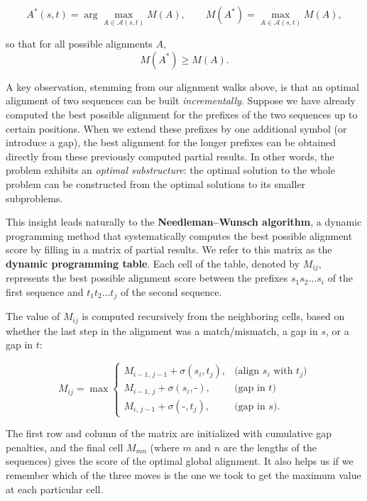 \[
A^*(s,t) = \arg\max_{A \in \mathcal{A}(s,t)} M(A),
\qquad
M(A^*) = \max_{A \in \mathcal{A}(s,t)} M(A),
\]

so that for all possible alignments $A$,
\[
M(A^*) \ge M(A).
\]


A key observation, stemming from our alignment walks above, is that an optimal alignment of two sequences can be built \emph{incrementally}. Suppose we have already computed the best possible alignment for the prefixes of the two sequences up to certain positions. When we extend these prefixes by one additional symbol (or introduce a gap), the best alignment for the longer prefixes can be obtained directly from these previously computed partial results. In other words, the problem exhibits an \emph{optimal substructure}: the optimal solution to the whole problem can be constructed from the optimal solutions to its smaller subproblems.

This insight leads naturally to the \textbf{Needleman–Wunsch algorithm}, 
a dynamic programming method that systematically computes the best possible alignment score by filling in a matrix of partial results. We refer to this matrix as the \textbf{dynamic programming table}. Each cell of the table, denoted by $M_{ij}$, represents the best possible alignment score between the prefixes $s_1 s_2 \ldots s_i$ of the first sequence and $t_1 t_2 \ldots t_j$ of the second sequence.

The value of $M_{ij}$ is computed recursively from the neighboring cells, based on whether the last step in the alignment was a match/mismatch, a gap in $s$, or a gap in $t$:

\[
M_{ij} = \max
\begin{cases}
M_{i-1,\,j-1} + \sigma(s_i, t_j), & \text{(align $s_i$ with $t_j$)}\\[6pt]
M_{i-1,\,j} + \sigma(s_i, \texttt{-}), & \text{(gap in $t$)}\\[6pt]
M_{i,\,j-1} + \sigma(\texttt{-}, t_j), & \text{(gap in $s$)}.
\end{cases}
\]

The first row and column of the matrix are initialized with cumulative gap penalties, and the final cell $M_{mn}$ (where $m$ and $n$ are the lengths of the sequences) gives the score of the optimal global alignment. It also helps us if we remember which of the three moves is the one we took to get the maximum value at each particular cell. 


